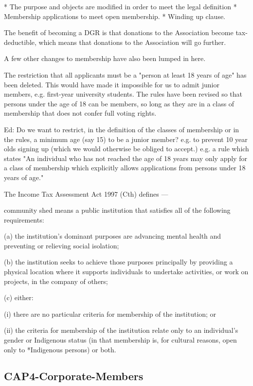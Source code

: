 \documentclass[../constitution.tex]{subfiles}
\begin{document}
* The purpose and objects are modified in order to meet the legal definition
* Membership applications to meet open membership.
* Winding up clause.

The benefit of becoming a DGR is that donations to the Association become tax-deductible, which means that donations to the Association will go further.


A few other changes to membership have also been lumped in here.

The restriction that all applicants must be a "person at least 18 years of age" has been deleted. This would have made it impossible for us to admit junior members, e.g. first-year university students. The rules have been revised so that persons under the age of 18 can be members, so long as they are in a class of membership that does not confer full voting rights.

Ed: Do we want to restrict, in the definition of the classes of membership or in the rules, a minimum age (say 15) to be a junior member? e.g. to prevent 10 year olds signing up (which we would otherwise be obliged to accept.) e.g. a rule which states "An individual who has not reached the age of 18 years may only apply for a class of membership which explicitly allows applications from persons under 18 years of age."




The Income Tax Assessment Act 1997 (Cth) defines ---


community shed means a public institution that satisfies all of the following requirements:

	(a)	the institution's dominant purposes are advancing mental health and preventing or relieving social isolation;

	(b)	the institution seeks to achieve those purposes principally by providing a physical location where it supports individuals to undertake activities, or work on projects, in the company of others;

	(c)	either:

	(i)	there are no particular criteria for membership of the institution; or

	(ii)	the criteria for membership of the institution relate only to an individual's gender or Indigenous status (in that membership is, for cultural reasons, open only to *Indigenous persons) or both.


\subsection*{CAP4-Corporate-Members}
\end{document}
